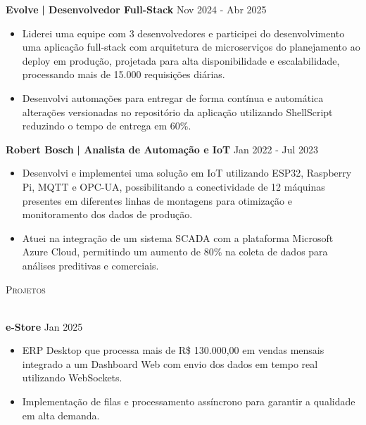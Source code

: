 \documentclass[a4paper]{article}
\newcommand{\lineunder}{
    \vspace*{-8pt} \\
    \hspace*{-18pt} \hrulefill \\
}
\newcommand{\header}[1]{
    {\hspace*{-18pt}\vspace*{6pt} \textsc{#1}}
    \vspace*{-6pt} \lineunder
}
\begin{document}
    \textbf{Evolve}\textbf{ | Desenvolvedor Full-Stack} \hfill  Nov 2024 - Abr 2025\\
    \vspace{-3mm}
    \begin{itemize} \itemsep -3pt
        \item Liderei uma equipe com 3 desenvolvedores e participei do desenvolvimento uma aplicação full-stack com arquitetura de microserviços do planejamento ao deploy em produção, projetada para alta disponibilidade e escalabilidade, processando mais de 15.000 requisições diárias.
        \item Desenvolvi automações para entregar de forma contínua e automática alterações versionadas no repositório da aplicação utilizando ShellScript reduzindo o tempo de entrega em 60\%.
    \end{itemize}

    \textbf{Robert Bosch}\textbf{ | Analista de Automação e IoT } \hfill  Jan 2022 - Jul 2023\\
    \vspace{-3mm}
    \begin{itemize} \itemsep -3pt
        \item Desenvolvi e implementei uma solução em IoT utilizando ESP32, Raspberry Pi, MQTT e OPC-UA, possibilitando a conectividade de 12 máquinas presentes em diferentes linhas de montagens para otimização e monitoramento dos dados de produção.
        \item Atuei na integração de um sistema SCADA com a plataforma Microsoft Azure Cloud, permitindo um aumento de 80\% na coleta de dados para análises preditivas e comerciais.
    \end{itemize}

    \header{Projetos}
    \vspace{2mm}

    \textbf{e-Store} \hfill  Jan 2025\\
    \vspace{-3mm}
    \begin{itemize} \itemsep -3pt
        \item ERP Desktop que processa mais de R\$ 130.000,00 em vendas mensais integrado a um Dashboard Web com envio dos dados em tempo real utilizando WebSockets.
        \item Implementação de filas e processamento assíncrono para garantir a qualidade em alta demanda. 
    \end{itemize}
\end{document}
